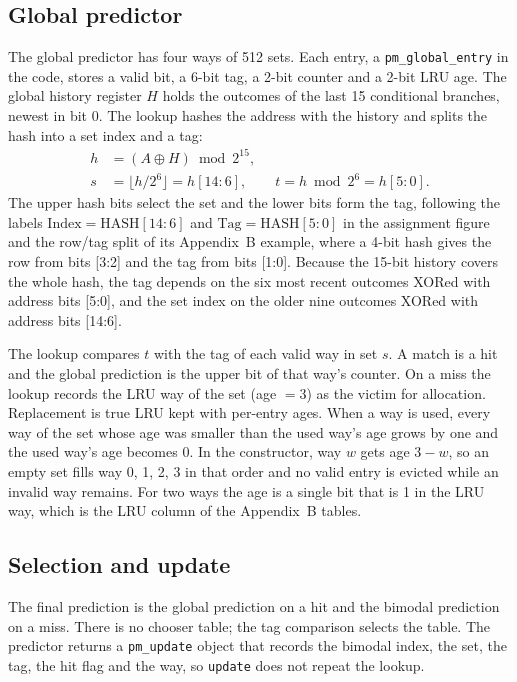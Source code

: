 \documentclass[11pt]{article}
\newcommand{\code}[1]{\texttt{#1}}
\begin{document}
\subsection{Global predictor}

The global predictor has four ways of 512 sets. Each entry, a \code{pm\_global\_entry} in the
code, stores a valid bit, a 6-bit tag, a 2-bit counter and a 2-bit LRU age. The global history
register $H$ holds the outcomes of the last 15 conditional branches, newest in bit 0. The lookup
hashes the address with the history and splits the hash into a set index and a tag:
%
\begin{align}
  h &= (A \oplus H) \bmod 2^{15}, \\
  s &= \lfloor h / 2^{6} \rfloor = h[14{:}6], \qquad t = h \bmod 2^{6} = h[5{:}0].
\end{align}
%
The upper hash bits select the set and the lower bits form the tag, following the labels
$\mathrm{Index} = \mathrm{HASH}[14{:}6]$ and $\mathrm{Tag} = \mathrm{HASH}[5{:}0]$ in the
assignment figure and the row/tag split of its Appendix~B example, where a 4-bit hash gives the
row from bits [3:2] and the tag from bits [1:0]. Because the 15-bit history covers the whole
hash, the tag depends on the six most recent outcomes XORed with address bits [5:0], and the
set index on the older nine outcomes XORed with address bits [14:6].

The lookup compares $t$ with the tag of each valid way in set $s$. A match is a hit and the
global prediction is the upper bit of that way's counter. On a miss the lookup records the LRU way of the set
(age $= 3$) as the victim for allocation. Replacement is true LRU kept with per-entry ages. When
a way is used, every way of the set whose age was smaller than the used way's age grows by one
and the used way's age becomes 0. In the constructor, way $w$ gets age $3 - w$, so an empty set
fills way 0, 1, 2, 3 in that order and no valid entry is evicted while an invalid way remains.
For two ways the age is a single bit that is 1 in the LRU way, which is the LRU column of the
Appendix~B tables.

\subsection{Selection and update}

The final prediction is the global prediction on a hit and the bimodal prediction on a miss.
There is no chooser table; the tag comparison selects the table. The predictor returns a
\code{pm\_update} object that records the bimodal index, the set, the tag, the hit flag and the
way, so \code{update} does not repeat the lookup.
\end{document}
